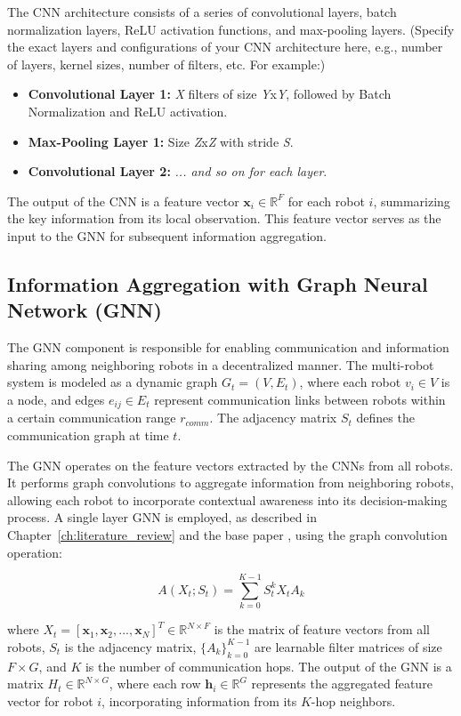 The CNN architecture consists of a series of convolutional layers, batch normalization layers, ReLU activation functions, and max-pooling layers.  (Specify the exact layers and configurations of your CNN architecture here, e.g., number of layers, kernel sizes, number of filters, etc. For example:)

\begin{itemize}
    \item \textbf{Convolutional Layer 1:} \textit{X} filters of size \textit{Y}x\textit{Y}, followed by Batch Normalization and ReLU activation.
    \item \textbf{Max-Pooling Layer 1:} Size \textit{Z}x\textit{Z} with stride \textit{S}.
    \item \textbf{Convolutional Layer 2:} \textit{... and so on for each layer}.
\end{itemize}

The output of the CNN is a feature vector $\mathbf{x}_i \in \mathbb{R}^F$ for each robot $i$, summarizing the key information from its local observation. This feature vector serves as the input to the GNN for subsequent information aggregation.

\subsection{Information Aggregation with Graph Neural Network (GNN)}

The GNN component is responsible for enabling communication and information sharing among neighboring robots in a decentralized manner. The multi-robot system is modeled as a dynamic graph $G_t = (V, E_t)$, where each robot $v_i \in V$ is a node, and edges $e_{ij} \in E_t$ represent communication links between robots within a certain communication range $r_{comm}$. The adjacency matrix $S_t$ defines the communication graph at time $t$.

The GNN operates on the feature vectors extracted by the CNNs from all robots. It performs graph convolutions to aggregate information from neighboring robots, allowing each robot to incorporate contextual awareness into its decision-making process.  A single layer GNN is employed, as described in Chapter~\ref{ch:literature_review} and the base paper \cite{Li_et_al_2020}, using the graph convolution operation:

\[
A(X_t; S_t) = \sum_{k=0}^{K-1} S_t^k X_t A_k
\]

where $X_t = [\mathbf{x}_1, \mathbf{x}_2, ..., \mathbf{x}_N]^T \in \mathbb{R}^{N \times F}$ is the matrix of feature vectors from all robots, $S_t$ is the adjacency matrix, $\{A_k\}_{k=0}^{K-1}$ are learnable filter matrices of size $F \times G$, and $K$ is the number of communication hops. The output of the GNN is a matrix $H_t \in \mathbb{R}^{N \times G}$, where each row $\mathbf{h}_i \in \mathbb{R}^G$ represents the aggregated feature vector for robot $i$, incorporating information from its $K$-hop neighbors.

